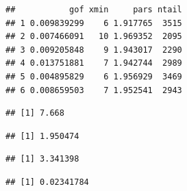 \documentclass[
]{book}
\newenvironment{Shaded}{\begin{snugshade}}{\end{snugshade}}
\newcommand{\CommentTok}[1]{\textcolor[rgb]{0.56,0.35,0.01}{\textit{#1}}}
\newcommand{\DecValTok}[1]{\textcolor[rgb]{0.00,0.00,0.81}{#1}}
\newcommand{\FunctionTok}[1]{\textcolor[rgb]{0.13,0.29,0.53}{\textbf{#1}}}
\newcommand{\NormalTok}[1]{#1}
\newcommand{\SpecialCharTok}[1]{\textcolor[rgb]{0.81,0.36,0.00}{\textbf{#1}}}
\begin{document}
\begin{verbatim}
##           gof xmin     pars ntail
## 1 0.009839299    6 1.917765  3515
## 2 0.007466091   10 1.969352  2095
## 3 0.009205848    9 1.943017  2290
## 4 0.013751881    7 1.942744  2989
## 5 0.004895829    6 1.956929  3469
## 6 0.008659503    7 1.952541  2943
\end{verbatim}

\begin{Shaded}
\end{Shaded}

\begin{verbatim}
## [1] 7.668
\end{verbatim}

\begin{Shaded}
\end{Shaded}

\begin{verbatim}
## [1] 1.950474
\end{verbatim}

\begin{Shaded}
\end{Shaded}

\begin{verbatim}
## [1] 3.341398
\end{verbatim}

\begin{Shaded}
\end{Shaded}

\begin{verbatim}
## [1] 0.02341784
\end{verbatim}
\end{document}
